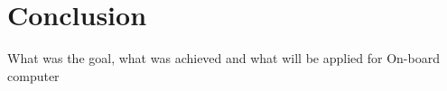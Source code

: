 \section{Conclusion} \label{sec:conclussion}
What was the goal, what was achieved and what will be applied for On-board computer 